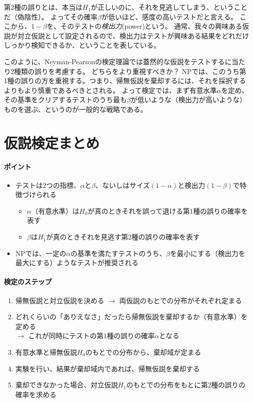 \documentclass{jsarticle}
\begin{document}
第2種の誤りとは、本当は$H_1$が正しいのに、それを見逃してしまう、ということだ（偽陰性）。
よってその確率$\beta$が低いほど、感度の高いテストだと言える。
ここから、$1-\beta$を、そのテストの\emph{検出力}(power)という。
通常、我々の興味ある仮説が対立仮説として設定されるので、検出力はテストが興味ある結果をどれだけしっかり検知できるか、ということを表している。

このように、Neyman-Pearsonの検定理論では蓋然的な仮説をテストするに当たり2種類の誤りを考慮する。
どちらをより重視すべきか？
NPでは、このうち第1種の誤りの方を重視する。つまり、帰無仮説を棄却するには、それを採択するよりもより慎重であるべきとされる。
よって検定では、まず有意水準$\alpha$を定め、その基準をクリアするテストのうち最も$\beta$が低いような（検出力が高いような）ものを選ぶ、というのが一般的な戦略である。

\section{仮説検定まとめ}

\paragraph{ポイント}
\begin{itemize}
 \item テストは2つの指標、$\alpha$と$\beta$、ないしはサイズ$(1-\alpha)$と検出力$(1-\beta)$で特徴づけられる
       \begin{itemize}
	\item $\alpha$（有意水準）は$H_0$が真のときそれを誤って退ける第1種の誤りの確率を表す
	\item $\beta$は$H_1$が真のときそれを見逃す第2種の誤りの確率を表す
       \end{itemize}
 \item NPでは、一定の$\alpha$の基準を満たすテストのうち、$\beta$を最小にする（検出力を最大にする）ようなテストが推奨される
\end{itemize}

\paragraph{検定のステップ}
\begin{enumerate}
 \item 帰無仮説と対立仮説を決める $\rightarrow$ 両仮説のもとでの分布がそれぞれ定まる
 \item どれくらいの「ありえなさ」だったら帰無仮説を棄却するか（有意水準）を定める \\
       $\rightarrow$ これが同時にテストの第1種の誤りの確率$\alpha$となる
 \item 有意水準と帰無仮説$H_0$のもとでの分布から、棄却域が定まる
 \item 実験を行い、結果が棄却域内であれば、帰無仮説を棄却する
 \item 棄却できなかった場合、対立仮説$H_1$のもとでの分布をもとに第2種の誤りの確率を求める
\end{enumerate}
\end{document}
